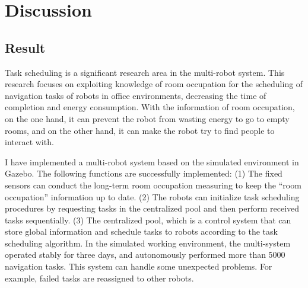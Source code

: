 





\chapter{Discussion}


\section{Result}
\label{sec:conclusion}
Task scheduling is a significant research area in the multi-robot system. This research focuses on exploiting knowledge of room occupation for the scheduling of navigation tasks of robots in office environments,
decreasing the time of completion and energy consumption. With the information of room occupation, on the one hand, it can prevent the robot from wasting energy to go to empty rooms, and on the other hand, it can make the robot try to find people to interact with. 

I have implemented a multi-robot system based on the simulated environment in Gazebo. 
The following functions are successfully implemented:
(1) The fixed sensors can conduct the long-term room occupation measuring to keep the ``room occupation'' information up to date. 
(2) The robots can initialize task scheduling procedures by requesting tasks in the centralized pool and then perform received tasks sequentially.
(3) The centralized pool, which is a control system that can store global information and schedule tasks to robots according to the task scheduling algorithm. 
In the simulated working environment, the multi-system operated stably for three days, and autonomously performed more than 5000 navigation tasks. This system can handle some unexpected problems. For example, failed tasks are reassigned to other robots.

